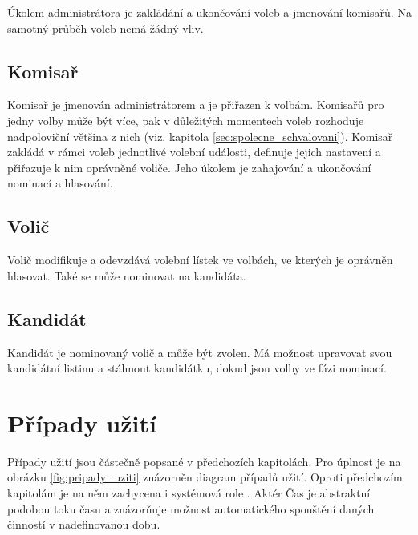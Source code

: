 \documentclass[11pt,twoside,a4paper]{book}
\begin{document}
Úkolem administrátora je zakládání a ukončování voleb a jmenování komisařů. Na samotný průběh voleb nemá žádný vliv. 

\subsection{Komisař}

Komisař je jmenován administrátorem a je přiřazen k volbám. Komisařů pro jedny volby může být více, pak v důležitých momentech voleb rozhoduje nadpoloviční většina z nich (viz. kapitola \ref{sec:spolecne_schvalovani}). Komisař zakládá v rámci voleb jednotlivé volební události, definuje jejich nastavení a přiřazuje k nim oprávněné voliče. Jeho úkolem je zahajování a ukončování nominací a hlasování.

\subsection{Volič}

Volič modifikuje a odevzdává volební lístek ve volbách, ve kterých je oprávněn hlasovat. Také se může nominovat na kandidáta.

\subsection{Kandidát}

Kandidát je nominovaný volič a může být zvolen. Má možnost upravovat svou kandidátní listinu a stáhnout kandidátku, dokud jsou volby ve fázi nominací.

\section{Případy užití}

Případy užití jsou částečně popsané v předchozích kapitolách. Pro úplnost je na obrázku \ref{fig:pripady_uziti} znázorněn diagram případů užití. Oproti předchozím kapitolám je na něm zachycena i systémová role . Aktér Čas je abstraktní podobou toku času a znázorňuje možnost automatického spouštění daných činností v nadefinovanou dobu. 
\end{document}
